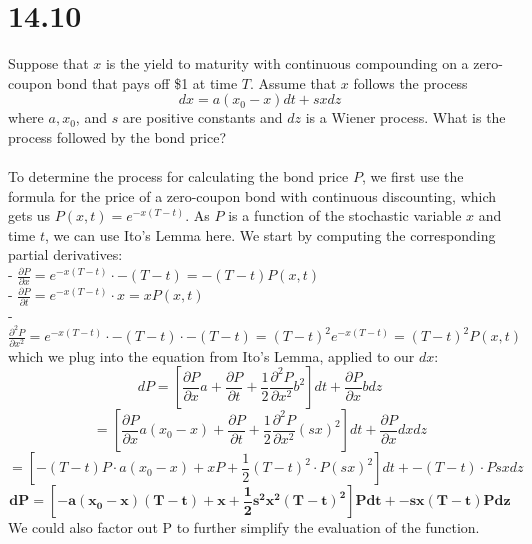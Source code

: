 \documentclass{article}
\begin{document}
{\Large 

\section*{14.10}
Suppose that \(x\) is the yield to maturity with continuous compounding on a zero-coupon bond that pays off \$1 at time \(T\). Assume that \(x\) follows the process
\[
  dx = a(x_0 - x)dt + sx dz
\]
where \(a, x_0\), and \(s\) are positive constants and \(dz\) is a Wiener process. What is the process followed by the bond price? \\ \\
To determine the process for calculating the bond price \(P\), we first use the formula for the price of a zero-coupon bond with continuous discounting, which gets us \(P(x, t) = e^{-x(T - t)}\). As \(P\) is a function of the stochastic variable \(x\) and time \(t\), we can use Ito's Lemma here. We start by computing the corresponding partial derivatives: \\
- \(\frac{\partial P}{\partial x} = e^{-x(T-t)} \cdot -(T-t) = -(T-t)P(x, t)\) \\
- \(\frac{\partial P}{\partial t} = e^{-x(T-t)} \cdot x = x P(x, t)\) \\
- \(\frac{\partial^2 P}{\partial x^2} = e^{-x(T-t)} \cdot -(T-t) \cdot -(T-t) = (T-t)^2 e^{-x(T-t)} = (T - t)^2 P(x,t)\) \\
which we plug into the equation from Ito's Lemma, applied to our \(dx\):
\[
  dP = [\frac{\partial P}{\partial x} a + \frac{\partial P}{\partial t} + \frac{1}{2} \frac{\partial^2 P}{\partial x^2} b^2]dt + \frac{\partial P}{\partial x} b dz
\]
\[
  = [\frac{\partial P}{\partial x} a(x_0 - x) + \frac{\partial P}{\partial t} + \frac{1}{2} \frac{\partial^2 P}{\partial x^2} (sx)^2]dt + \frac{\partial P}{\partial x} dx dz
\]
\[
  = [-(T-t)P \cdot a(x_0 - x) + xP + \frac{1}{2} (T-t)^2 \cdot P (sx)^2]dt + -(T - t) \cdot P sx dz
\]
\[
  \boxed{\mathbf{dP = [-a (x_0 - x) (T-t) + x + \frac{1}{2} s^2x^2 (T-t)^2]Pdt + -sx(T - t) P dz}}
\]
We could also factor out P to further simplify the evaluation of the function. 

}
\end{document}
